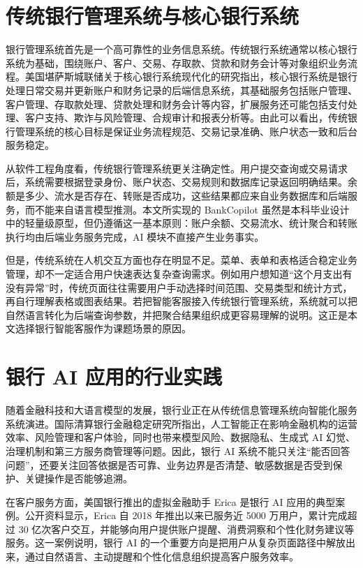 \documentclass[bachelor, print]{xduthesis}
\begin{document}
\section{传统银行管理系统与核心银行系统}

银行管理系统首先是一个高可靠性的业务信息系统。传统银行系统通常以核心银行系统为基础，围绕账户、客户、交易、存取款、贷款和财务会计等对象组织业务流程。美国堪萨斯城联储关于核心银行系统现代化的研究指出，核心银行系统是银行处理日常交易并更新账户和财务记录的后端信息系统，其基础服务包括账户管理、客户管理、存取款处理、贷款处理和财务会计等内容，扩展服务还可能包括支付处理、客户支持、欺诈与风险管理、合规审计和报表分析等\cite{kcfed2024corebanking}。由此可以看出，传统银行管理系统的核心目标是保证业务流程规范、交易记录准确、账户状态一致和后台服务稳定。

从软件工程角度看，传统银行管理系统更关注确定性。用户提交查询或交易请求后，系统需要根据登录身份、账户状态、交易规则和数据库记录返回明确结果。余额是多少、流水是否存在、转账是否成功，这些结果都应来自业务数据库和后端服务，而不能来自语言模型推测。本文所实现的 BankCopilot 虽然是本科毕业设计中的轻量级原型，但仍遵循这一基本原则：账户余额、交易流水、统计聚合和转账执行均由后端业务服务完成，AI 模块不直接产生业务事实。

但是，传统系统在人机交互方面也存在明显不足。菜单、表单和表格适合稳定业务管理，却不一定适合用户快速表达复杂查询需求。例如用户想知道“这个月支出有没有异常”时，传统页面往往需要用户手动选择时间范围、交易类型和统计方式，再自行理解表格或图表结果。若把智能客服接入传统银行管理系统，系统就可以把自然语言转化为后端查询参数，并把聚合结果组织成更容易理解的说明。这正是本文选择银行智能客服作为课题场景的原因。

\section{银行 AI 应用的行业实践}

随着金融科技和大语言模型的发展，银行业正在从传统信息管理系统向智能化服务系统演进。国际清算银行金融稳定研究所指出，人工智能正在影响金融机构的运营效率、风险管理和客户体验，同时也带来模型风险、数据隐私、生成式 AI 幻觉、治理机制和第三方服务商管理等问题\cite{bis2024regulatingai}。因此，银行 AI 系统不能只关注“能否回答问题”，还要关注回答依据是否可靠、业务边界是否清楚、敏感数据是否受到保护、关键操作是否能够追溯。

在客户服务方面，美国银行推出的虚拟金融助手 Erica 是银行 AI 应用的典型案例。公开资料显示，Erica 自 2018 年推出以来已服务近 5000 万用户，累计完成超过 30 亿次客户交互，并能够向用户提供账户提醒、消费洞察和个性化财务建议等服务\cite{bofa2025erica}。这一案例说明，银行 AI 的一个重要方向是把用户从复杂页面路径中解放出来，通过自然语言、主动提醒和个性化信息组织提高客户服务效率。
\end{document}
